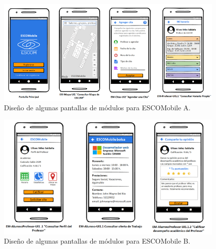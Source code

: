 \begin{figure}[!htpb]
	\hypertarget{fig:interfaces_uno}{\hspace{1pt}}
	\begin{center}
		\includegraphics[width=1\textwidth]{images/reporte/interfaces1.png}
		\caption{Diseño de algunas pantallas de módulos para ESCOMobile A.}
		\label{fig:interfaces_uno}
	\end{center}
\end{figure}

\begin{figure}[!htpb]
	\hypertarget{fig:interfaces_dos}{\hspace{1pt}}
	\begin{center}
		\includegraphics[width=1\textwidth]{images/reporte/interfaces2.png}
		\caption{Diseño de algunas pantallas de módulos para ESCOMobile B.}
		\label{fig:interfaces_dos}
	\end{center}
\end{figure}


